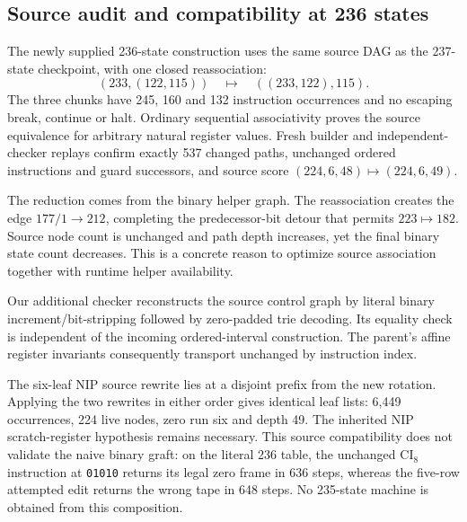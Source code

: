 \subsection{Source audit and compatibility at 236 states}

The newly supplied 236-state construction uses the same source DAG as the
237-state checkpoint, with one closed reassociation:
\[
 (233,(122,115))\quad\longmapsto\quad((233,122),115).
\]
The three chunks have 245, 160 and 132 instruction occurrences and no escaping
break, continue or halt.  Ordinary sequential associativity proves the source
equivalence for arbitrary natural register values.  Fresh builder and
independent-checker replays confirm exactly 537 changed paths, unchanged
ordered instructions and guard successors, and source score
$(224,6,48)\mapsto(224,6,49)$.

The reduction comes from the binary helper graph.  The reassociation creates
the edge $177/1\to212$, completing the predecessor-bit detour that permits
$223\mapsto182$.  Source node count is unchanged and path depth increases,
yet the final binary state count decreases.  This is a concrete reason to
optimize source association together with runtime helper availability.

Our additional checker reconstructs the source control graph by literal binary
increment/bit-stripping followed by zero-padded trie decoding.  Its equality
check is independent of the incoming ordered-interval construction.  The
parent's affine register invariants consequently transport unchanged by
instruction index.

The six-leaf NIP source rewrite lies at a disjoint prefix from the new rotation.
Applying the two rewrites in either order gives identical leaf lists: 6,449
occurrences, 224 live nodes, zero run six and depth 49.  The inherited NIP
scratch-register hypothesis remains necessary.  This source compatibility
does not validate the naive binary graft: on the literal 236 table, the
unchanged $\mathrm{CI}_8$ instruction at \texttt{01010} returns its legal zero
frame in 636 steps, whereas the five-row attempted edit returns the wrong tape
in 648 steps.  No 235-state machine is obtained from this composition.
